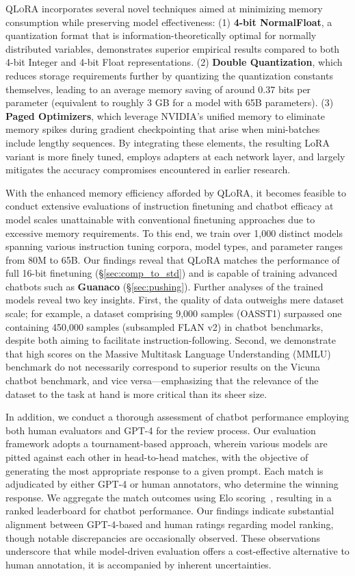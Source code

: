 \textsc{QLoRA} incorporates several novel techniques aimed at minimizing memory consumption while preserving model effectiveness: (1) \textbf{4-bit NormalFloat}, a quantization format that is information-theoretically optimal for normally distributed variables, demonstrates superior empirical results compared to both 4-bit Integer and 4-bit Float representations. (2) \textbf{Double Quantization}, which reduces storage requirements further by quantizing the quantization constants themselves, leading to an average memory saving of around 0.37 bits per parameter (equivalent to roughly 3 GB for a model with 65B parameters). (3) \textbf{Paged Optimizers}, which leverage NVIDIA’s unified memory to eliminate memory spikes during gradient checkpointing that arise when mini-batches include lengthy sequences. By integrating these elements, the resulting LoRA variant is more finely tuned, employs adapters at each network layer, and largely mitigates the accuracy compromises encountered in earlier research.

With the enhanced memory efficiency afforded by \textsc{QLoRA}, it becomes feasible to conduct extensive evaluations of instruction finetuning and chatbot efficacy at model scales unattainable with conventional finetuning approaches due to excessive memory requirements. To this end, we train over 1,000 distinct models spanning various instruction tuning corpora, model types, and parameter ranges from 80M to 65B. Our findings reveal that \textsc{QLoRA} matches the performance of full 16-bit finetuning (\S\ref{sec:comp_to_std}) and is capable of training advanced chatbots such as \textbf{Guanaco} (\S\ref{sec:pushing}). Further analyses of the trained models reveal two key insights. First, the quality of data outweighs mere dataset scale; for example, a dataset comprising 9,000 samples (OASST1) surpassed one containing 450,000 samples (subsampled FLAN v2) in chatbot benchmarks, despite both aiming to facilitate instruction-following. Second, we demonstrate that high scores on the Massive Multitask Language Understanding (MMLU) benchmark do not necessarily correspond to superior results on the Vicuna chatbot benchmark, and vice versa—emphasizing that the relevance of the dataset to the task at hand is more critical than its sheer size.

In addition, we conduct a thorough assessment of chatbot performance employing both human evaluators and GPT-4 for the review process. Our evaluation framework adopts a tournament-based approach, wherein various models are pitted against each other in head-to-head matches, with the objective of generating the most appropriate response to a given prompt. Each match is adjudicated by either GPT-4 or human annotators, who determine the winning response. We aggregate the match outcomes using Elo scoring~\citep{elo1967proposed, elo1978rating}, resulting in a ranked leaderboard for chatbot performance. Our findings indicate substantial alignment between GPT-4-based and human ratings regarding model ranking, though notable discrepancies are occasionally observed. These observations underscore that while model-driven evaluation offers a cost-effective alternative to human annotation, it is accompanied by inherent uncertainties.

